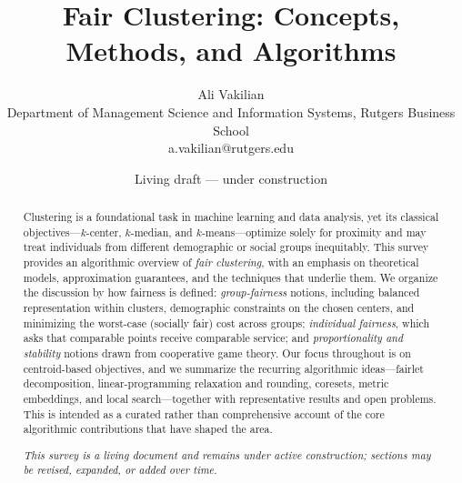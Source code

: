 \documentclass[11pt]{article}
\title{Fair Clustering: Concepts, Methods, and Algorithms}
\author{Ali Vakilian \\ Department of Management Science and Information Systems, Rutgers Business School \\ {\sf a.vakilian@rutgers.edu}}
\date{Living draft --- under construction}
\begin{document}
\maketitle

\begin{abstract}
\noindent
Clustering is a foundational task in machine learning and data analysis, yet its classical objectives---$k$-center, $k$-median, and $k$-means---optimize solely for proximity and may treat individuals from different demographic or social groups inequitably. This survey provides an algorithmic overview of \emph{fair clustering}, with an emphasis on theoretical models, approximation guarantees, and the techniques that underlie them. We organize the discussion by how fairness is defined: \emph{group-fairness} notions, including balanced representation within clusters, demographic constraints on the chosen centers, and minimizing the worst-case (socially fair) cost across groups; \emph{individual fairness}, which asks that comparable points receive comparable service; and \emph{proportionality and stability} notions drawn from cooperative game theory. Our focus throughout is on centroid-based objectives, and we summarize the recurring algorithmic ideas---fairlet decomposition, linear-programming relaxation and rounding, coresets, metric embeddings, and local search---together with representative results and open problems. This is intended as a curated rather than comprehensive account of the core algorithmic contributions that have shaped the area.

\medskip\noindent\emph{This survey is a living document and remains under active construction; sections may be revised, expanded, or added over time.}
\end{abstract}

\noindent\setlength{\fboxsep}{8pt}
\medskip
\end{document}
